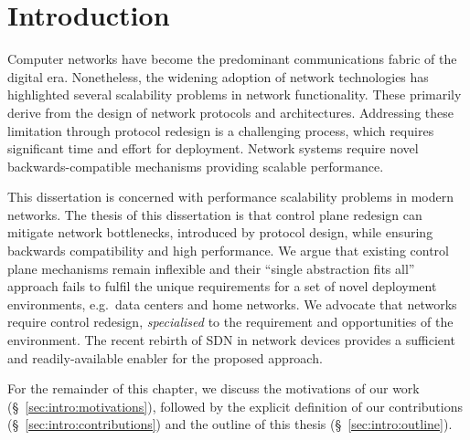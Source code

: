 \chapter{Introduction} \label{s:introduction:introduction}

Computer networks have become the predominant communications fabric of the
digital era. Nonetheless, the widening adoption of network technologies has
highlighted several scalability problems in network functionality. These
primarily derive from the design of network protocols and architectures.
Addressing these limitation through protocol redesign is a challenging process,
which requires significant time and effort for deployment. Network systems
require novel backwards-compatible mechanisms providing scalable performance. 

This dissertation is concerned with performance scalability problems in modern
networks.  The thesis of this dissertation is that control plane redesign can
mitigate network bottlenecks, introduced by protocol design, while ensuring
backwards compatibility and high performance. We argue that existing control
plane mechanisms remain inflexible and their ``single abstraction fits all''
approach fails to fulfil the unique requirements for a set of novel deployment
environments, e.g.~data centers and home networks.  We advocate that
networks require control redesign, \textit{specialised} to the requirement and
opportunities of  the environment. The recent rebirth of SDN in network devices
provides a sufficient and readily-available enabler for the proposed approach. 

For the remainder of this chapter, we discuss the motivations of our work
(\S~\ref{sec:intro:motivations}), followed by the explicit definition of our
contributions (\S~\ref{sec:intro:contributions}) and  the outline of this thesis
(\S~\ref{sec:intro:outline}).



